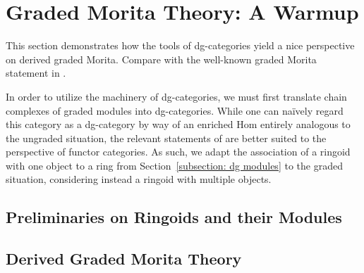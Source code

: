 \chapter{Graded Morita Theory: A Warmup} \label{chapter: graded Morita}

This section demonstrates how the tools of dg-categories yield a nice perspective on derived graded Morita. Compare with the well-known graded Morita statement in \textcite{Zhang96}. 

In order to utilize the machinery of dg-categories, we must first translate chain complexes of graded modules into dg-categories.
While one can na\"ively regard this category as a dg-category by way of an enriched Hom entirely analogous to the ungraded situation, the relevant statements of \textcite{Toen07} are better suited to the perspective of functor categories.
As such, we adapt the association of a ringoid with one object to a ring from Section~\ref{subsection: dg modules} to the graded situation, considering instead a ringoid with multiple objects.

\section{Preliminaries on Ringoids and their Modules}


\section{Derived Graded Morita Theory}

